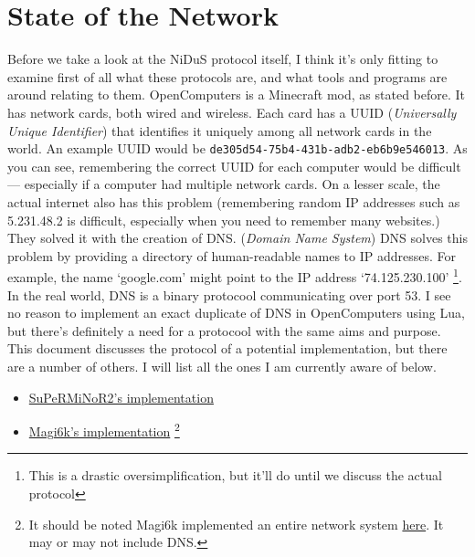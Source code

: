 \documentclass[]{report}
\begin{document}
\chapter{State of the Network}
Before we take a look at the NiDuS protocol itself, I think it's only fitting to examine first of all what these protocols are, and what tools and programs are around relating to them.
OpenComputers is a Minecraft mod, as stated before. It has network cards, both wired and wireless. Each card has a UUID (\textit{Universally Unique Identifier}) that identifies it uniquely among all network cards in the world. An example UUID would be \texttt{de305d54-75b4-431b-adb2-eb6b9e546013}. As you can see, remembering the correct UUID for each computer would be difficult --- especially if a computer had multiple network cards. On a lesser scale, the actual internet also has this problem (remembering random IP addresses such as 5.231.48.2 is difficult, especially when you need to remember many websites.) They solved it with the creation of DNS. (\textit{Domain Name System}) DNS solves this problem by providing a directory of human-readable names to IP addresses. For example, the name `google.com' might point to the IP address `74.125.230.100' \footnote{This is a drastic oversimplification, but it'll do until we discuss the actual protocol}. In the real world, DNS is a binary protocool communicating over port 53. I see no reason to implement an exact duplicate of DNS in OpenComputers using Lua, but there's definitely a need for a protocool with the same aims and purpose. This document discusses the protocol of a potential implementation, but there are a number of others. I will list all the ones I am currently aware of below.
\begin{itemize}
	\item \href{https://github.com/OpenPrograms/SuPeRMiNoR2-Programs/blob/master/networking/dns.lua}{SuPeRMiNoR2's implementation}
	\item
	\href{http://oc.cil.li/index.php?/topic/215-dns-system/}{Magi6k's implementation} \footnote{It should be noted Magi6k implemented an entire network system \href{https://github.com/OpenPrograms/Magik6k-Programs/tree/master/network}{here}. It may or may not include DNS.}
\end{itemize}
\appendix
\end{document}
